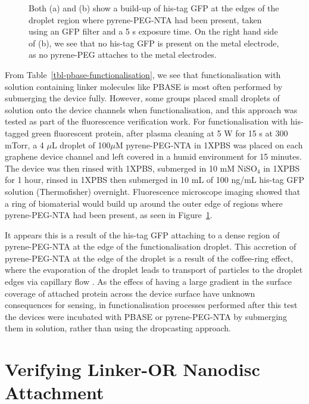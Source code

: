 \documentclass[
  a4paper,
]{scrbook}
\begin{document}
\begin{figure}
\begin{minipage}[t]{0.47\linewidth}
{{}

}

\subcaption{\label{fig-GFP-coffee-ring-2}}
\end{minipage}%

\caption{\label{fig-GFP-coffee-ring}Both (a) and (b) show a build-up of
his-tag GFP at the edges of the droplet region where pyrene-PEG-NTA had
been present, taken using an GFP filter and a 5 s exposure time. On the
right hand side of (b), we see that no his-tag GFP is present on the
metal electrode, as no pyrene-PEG attaches to the metal electrodes.}

\end{figure}

From Table~\ref{tbl-pbase-functionalisation}, we see that
functionalisation with solution containing linker molecules like PBASE
is most often performed by submerging the device fully. However, some
groups placed small droplets of solution onto the device channels when
functionalisation, and this approach was tested as part of the
fluorescence verification work. For functionalisation with his-tagged
green fluorescent protein, after plasma cleaning at 5 W for 15 s at 300
mTorr, a 4 \(\mu\)L droplet of 100\(\mu\)M pyrene-PEG-NTA in 1XPBS was
placed on each graphene device channel and left covered in a humid
environment for 15 minutes. The device was then rinsed with 1XPBS,
submerged in 10 mM NiSO\(_4\) in 1XPBS for 1 hour, rinsed in 1XPBS then
submerged in 10 mL of 100 ng/mL his-tag GFP solution (Thermofisher)
overnight. Fluorescence microscope imaging showed that a ring of
biomaterial would build up around the outer edge of regions where
pyrene-PEG-NTA had been present, as seen in
Figure~\ref{fig-GFP-coffee-ring}.

It appears this is a result of the his-tag GFP attaching to a dense
region of pyrene-PEG-NTA at the edge of the functionalisation droplet.
This accretion of pyrene-PEG-NTA at the edge of the droplet is a result
of the coffee-ring effect, where the evaporation of the droplet leads to
transport of particles to the droplet edges via capillary flow
\autocite{Deegan1997,Shimobayashi2018}. As the effecs of having a large
gradient in the surface coverage of attached protein across the device
surface have unknown consequences for sensing, in functionalisation
processes performed after this test the devices were incubated with
PBASE or pyrene-PEG-NTA by submerging them in solution, rather than
using the dropcasting approach.

\hypertarget{sec-linker-receptor-attachment}{%
\section{Verifying Linker-OR Nanodisc
Attachment}\label{sec-linker-receptor-attachment}}
\end{document}
